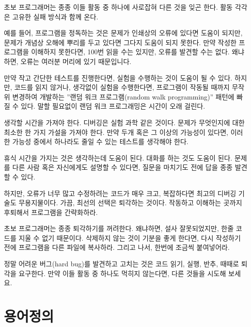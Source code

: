 초보 프로그래머는 종종 이들 활동 중 하나에 사로잡혀 다른 것을 잊곤 한다. 
활동 각각은 고유한 실패 방식과 함께 온다.


예를 들어, 프로그램을 정독하는 것은 문제가 인쇄상의 오류에 있다면 도움이 되지만, 문제가 개념상 오해에 뿌리를 두고 있다면 그다지 도움이 되지 못한다. 
만약 작성한 프로그램을 이해하지 못한다면, 100번 읽을 수는 있지만, 오류를 발견할 수는 없다.
왜냐하면, 오류는 여러분 머리에 있기 때문입니다.


만약 작고 간단한 테스트를 진행한다면, 실험을 수행하는 것이 도움이 될 수 있다.
하지만, 코드를 읽지 않거나, 생각없이 실험을 수행한다면, 프로그램이 작동될 때까지 무작위 변경하여 개발하는 ''랜덤 워크 프로그램(random walk programming)'' 패턴에 빠질 수 있다. 
말할 필요없이 랜덤 워크 프로그래밍은 시간이 오래 걸린다.


생각할 시간을 가져야 한다. 
디버깅은 실험 과학 같은 것이다. 
문제가 무엇인지에 대한 최소한 한 가지 가설을 가져야 한다.
만약 두개 혹은 그 이상의 가능성이 있다면, 이러한 가능성 중에서 하나라도 줄일 수 있는 테스트를 생각해야 한다.

휴식 시간을 가지는 것은 생각하는데 도움이 된다. 
대화를 하는 것도 도움이 된다.
문제를 다른 사람 혹은 자신에게도 설명할 수 있다면, 질문을 마치기도 전에 답을 종종 발견할 수 있다.

하지만, 오류가 너무 많고 수정하려는 코드가 매우 크고, 복잡하다면 최고의 디버깅 기술도 무용지물이다.
가끔, 최선의 선택은 퇴각하는 것이다. 
작동하고 이해하는 곳까지 후퇴해서 프로그램을 간략화하라.

초보 프로그래머는 종종 퇴각하기를 꺼려한다. 
왜냐하면, 설사 잘못되었지만, 한줄 코드를 지울 수 없기 때문이다.
삭제하지 않는 것이 기분을 좋게 한다면, 다시 작성하기 전에 프로그램을 다른 파일에 복사하라.
그리고 나서, 한번에 조금씩 붙여넣어라. 

정말 어려운 버그(hard bug)를 발견하고 고치는 것은 코드 읽기, 실행, 반추, 때때로 퇴각을 요구한다.
만약 이들 활동 중 하나도 먹히지 않는다면, 다른 것들을 시도해 보세요.

\section{용어정의}

